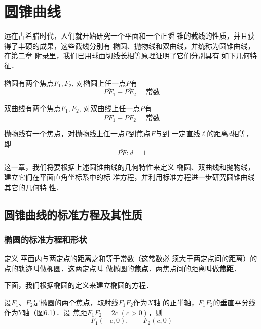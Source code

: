 \chapter{圆锥曲线}
远在古希腊时代，人们就开始研究一个平面和一个正瞬
锥的截线的性质，并且获得了丰硕的成果，这些截线分别有
椭圆、抛物线和双曲线，并统称为圆锥曲线，在第二章
附录里，我们已用球面切线长相等原理证明了它们分别具有
如下几何特征．

椭圆有两个焦点$F_1,F_2$, 对椭圆上任一点$P$有
\[\overline{PF_1}+\overline{PF_2}=\text{常数}\]

双曲线有两个焦点$F_1,F_2$, 对双曲线上任一点$P$有
\[\overline{PF_1}-\overline{PF_2}=\text{常数}\]

抛物线有一个焦点，对抛物线上任一点$P$到焦点$F$与到
一定直线$\ell$的距离$d$相等，即
\[\overline{PF}:d=1\]

这一章，我们将要根据上述圆锥曲线的几何特性来定义
椭圆、双曲线和抛物线，建立它们在平面直角坐标系中的标
准方程，并利用标准方程进一步研究圆锥曲线其它的几何特
性．

\section{圆锥曲线的标准方程及其性质}
\subsection{椭圆的标准方程和形状}
\begin{blk}
    {定义} 平面内与两定点的距离之和等于常数（这常数必
须大于两定点间的距离）的点的轨迹叫做椭圆．这两定点叫
做椭圆的\textbf{焦点}．两焦点间的距离叫做\textbf{焦距}．
\end{blk}

下面，我们根据椭圆的定义来建立椭圆的方程．

设$F_1$、$F_2$是椭圆的两个焦点，取射线$F_1F_2$作为$X$轴
的正半轴，$\overline{F_1F_2}$的垂直平分线作为$Y$轴（图6.1）．设
焦距$\overline{F_1F_2}=2c\; (c>0)$，则
\[F_1(-c,0),\qquad F_2(c,0)\]

\begin{figure}[htp]
    \centering
    \caption{}
\end{figure}


